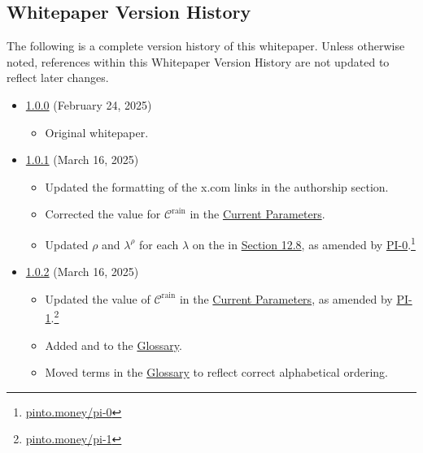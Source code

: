\documentclass[class=article, crop=false]{standalone}
\begin{document}

\subsection{Whitepaper Version History}

The following is a complete version history of this whitepaper. Unless otherwise noted, references within this Whitepaper Version History are not updated to reflect later changes.

\begin{itemize}[topsep=0pt, itemsep=3pt,leftmargin=16pt]
    \item \href{https://github.com/pinto-org/whitepaper/blob/master/version-history/pinto1_0_0.pdf}{1.0.0} (February 24, 2025)
    
    \begin{itemize}
        \item Original whitepaper.
    \end{itemize}
    
    \item \href{https://github.com/pinto-org/whitepaper/blob/master/version-history/pinto1_0_1.pdf}{1.0.1} (March 16, 2025)
    
    \begin{itemize}
        \item Updated the formatting of the x.com links in the authorship section.
        \item Corrected the value for $\mathscr{C}^{\text{rain}}$ in the \hyperlink{subsection.12.1}{Current Parameters}.
        \item Updated $\rho$ and $\lambda^{\rho}$ for each $\lambda$ on the  in \hyperlink{subsection.12.8}{Section 12.8}, as amended by \href{https://pinto.money/pi-0}{PI-0}.\footnote{\href{https://pinto.money/pi-0}{pinto.money/pi-0}}
    \end{itemize}

    \item \href{https://github.com/pinto-org/whitepaper/blob/master/version-history/pinto1_0_2.pdf}{1.0.2} (March 16, 2025)
    
    \begin{itemize}
        \item Updated the value of $\mathscr{C}^{\text{rain}}$ in the \hyperlink{subsection.12.1}{Current Parameters}, as amended by \href{https://pinto.money/pi-1}{PI-1}.\footnote{\href{https://pinto.money/pi-1}{pinto.money/pi-1}}
        \item Added  and  to the \href{https://github.com/pinto-org/whitepaper/blob/master/version-history/pinto1_0_2.pdf}{Glossary}.
        \item Moved terms in the \href{https://github.com/pinto-org/whitepaper/blob/master/version-history/pinto1_0_2.pdf}{Glossary} to reflect correct alphabetical ordering.
    \end{itemize}


\end{itemize}
\end{document}
